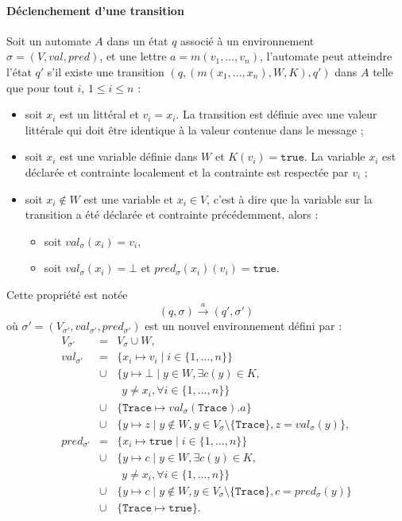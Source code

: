 \paragraph{D\'eclenchement d'une transition}
Soit un automate $A$ dans un \'etat $q$ associ\'e \`a un
environnement $\sigma=(V,val,pred)$, et une lettre $a = m(v_1,\dots,v_n)$, l'automate peut atteindre l'\'etat $q'$ s'il existe
une transition $(q,(m(x_1,\dots,x_n),
W,K),q')$ dans $A$ telle que pour tout $i$, $1\leq i\leq n$ :
\begin{itemize}
  \item soit $x_i$ est un litt\'eral et $v_i=x_i$. La transition est
  d\'efinie avec une valeur litt\'erale qui doit \^etre
  identique \`a la valeur contenue dans le message ;
\item soit $x_i$ est une variable d\'efinie dans $W$ et
  $K(v_i)=\mathtt{true}$. La variable $x_i$ est d\'eclar\'ee et
  contrainte localement et la contrainte est respect\'ee par $v_i$ ;
\item soit $x_i\not\in W$ est une variable et  $x_i \in
  V$, c'est \`a dire que la variable sur la transition a \'et\'e
  d\'eclar\'ee et contrainte pr\'ec\'edemment, alors :
  \begin{itemize}
    \item soit $val_\sigma(x_i)=v_i$,
    \item soit $val_\sigma(x_i)= \bot$ et $pred_\sigma(x_i)(v_i) = \mathtt{true}$.
  \end{itemize}
\end{itemize}
Cette propri\'et\'e est not\'ee
$$
(q,\sigma) \xrightarrow{a} (q',\sigma')
$$
o\`u $\sigma'=(V_{\sigma'}, val_{\sigma'},pred_{\sigma'})$ est un
nouvel environnement d\'efini  par :
$$
\begin{array}{rcl}
V_{\sigma'} &=&  V_\sigma \cup W, \\
val_{\sigma'} &=& \{x_i \mapsto v_i \mid  i \in \{1,\dots,n\} \} \\
& \cup& \{y \mapsto \bot \mid y \in W, \exists c(y) \in K,\\
&&\ \ y \neq x_i, \forall i \in \{1,\dots,n\} \} \\
& \cup & \{\mathtt{Trace} \mapsto val_\sigma(\mathtt{Trace}).a\} \\
&\cup& \{y \mapsto z \mid y \not\in W, y \in V_\sigma\setminus\{\mathtt{Trace}\}, z = val_\sigma(y)\}, \\
pred_{\sigma'}&=&  \{x_i \mapsto \mathtt{true} \mid i \in
\{1,\dots,n\} \} \\
& \cup& \{y \mapsto c \mid y \in W, \exists c(y) \in K,\\
&&\ \ y \neq x_i, \forall i \in \{1,\dots,n\} \} \\
& \cup& \{y \mapsto c \mid y \not\in W, y \in V_\sigma\setminus\{\mathtt{Trace}\}, c = pred_\sigma(y)\}\\
& \cup& \{\mathtt{Trace} \mapsto \mathtt{true}\}.\\
\end{array}
$$

